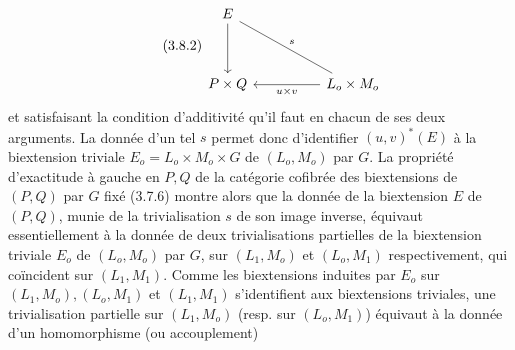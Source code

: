 \begin{equation}\tag{3.8.2}
\begin{tikzcd}[column sep=huge, row sep=huge]
E \arrow[d] \arrow[dr, dash, "s"] & \\
P \times Q & L_o \times M_o \arrow[l, "u \times v"]
\end{tikzcd}
\end{equation}
et satisfaisant la condition d'additivité qu'il faut en chacun de ses deux arguments. La donnée d'un tel $s$ permet donc d'identifier $(u,v)^{*}(E)$ à la biextension triviale $E_o = L_o \times M_o \times G$ de $(L_o,M_o)$ par $G$. La propriété d'exactitude à gauche en $P,Q$ de la catégorie cofibrée des biextensions de $(P,Q)$ par $G$ fixé (3.7.6) montre alors que la donnée de la biextension $E$ de $(P,Q)$, munie de la trivialisation $s$ de son image inverse, équivaut essentiellement à la donnée de deux trivialisations partielles de la biextension triviale $E_o$ de $(L_o,M_o)$ par $G$, sur $(L_1,M_o)$ et $(L_o,M_1)$ respectivement, qui coïncident sur $(L_1,M_1)$. Comme les biextensions induites par $E_o$ sur $(L_1,M_o),(L_o,M_1)$ et $(L_1,M_1)$ s'identifient aux biextensions triviales, une trivialisation partielle sur $(L_1,M_o)$ (resp. sur $(L_o,M_1)$) équivaut à la donnée d'un homomorphisme (ou accouplement)

